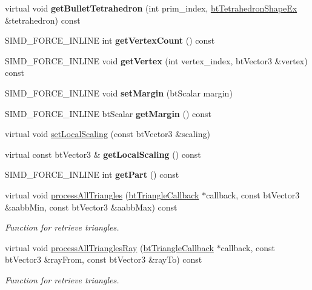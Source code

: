 \begin{DoxyCompactItemize}
virtual void {\bfseries get\+Bullet\+Tetrahedron} (int prim\+\_\+index, \hyperlink{classbtTetrahedronShapeEx}{bt\+Tetrahedron\+Shape\+Ex} \&tetrahedron) const
\item 
\mbox{\label{classbtGImpactMeshShapePart_a1f769ae0853fc7f336481b3b9be5cdef}} 
S\+I\+M\+D\+\_\+\+F\+O\+R\+C\+E\+\_\+\+I\+N\+L\+I\+NE int {\bfseries get\+Vertex\+Count} () const
\item 
\mbox{\label{classbtGImpactMeshShapePart_a40427b8e3fdfcc490b08f580a9199ee5}} 
S\+I\+M\+D\+\_\+\+F\+O\+R\+C\+E\+\_\+\+I\+N\+L\+I\+NE void {\bfseries get\+Vertex} (int vertex\+\_\+index, bt\+Vector3 \&vertex) const
\item 
\mbox{\label{classbtGImpactMeshShapePart_a6f77efd41c832e436bfd6cca7d3269e7}} 
S\+I\+M\+D\+\_\+\+F\+O\+R\+C\+E\+\_\+\+I\+N\+L\+I\+NE void {\bfseries set\+Margin} (bt\+Scalar margin)
\item 
\mbox{\label{classbtGImpactMeshShapePart_ad6ad76f22c8d08c71fda98b53ab2ce4d}} 
S\+I\+M\+D\+\_\+\+F\+O\+R\+C\+E\+\_\+\+I\+N\+L\+I\+NE bt\+Scalar {\bfseries get\+Margin} () const
\item 
virtual void \hyperlink{classbtGImpactMeshShapePart_a2c1de297d020a75e1ab0f10f7c71478f}{set\+Local\+Scaling} (const bt\+Vector3 \&scaling)
\item 
\mbox{\label{classbtGImpactMeshShapePart_af0428a406356b3c9b157efc4a5116a79}} 
virtual const bt\+Vector3 \& {\bfseries get\+Local\+Scaling} () const
\item 
\mbox{\label{classbtGImpactMeshShapePart_a0b9a1dbcc0acd7a3082b2dbfbc5ef5d5}} 
S\+I\+M\+D\+\_\+\+F\+O\+R\+C\+E\+\_\+\+I\+N\+L\+I\+NE int {\bfseries get\+Part} () const
\item 
virtual void \hyperlink{classbtGImpactMeshShapePart_a85befbcefc4db8ce35db58dc1965d512}{process\+All\+Triangles} (\hyperlink{classbtTriangleCallback}{bt\+Triangle\+Callback} $\ast$callback, const bt\+Vector3 \&aabb\+Min, const bt\+Vector3 \&aabb\+Max) const
\begin{DoxyCompactList}\small\item\em Function for retrieve triangles. \end{DoxyCompactList}\item 
virtual void \hyperlink{classbtGImpactMeshShapePart_a5a7308f0d61d403394d909b45506a7e9}{process\+All\+Triangles\+Ray} (\hyperlink{classbtTriangleCallback}{bt\+Triangle\+Callback} $\ast$callback, const bt\+Vector3 \&ray\+From, const bt\+Vector3 \&ray\+To) const
\begin{DoxyCompactList}\small\item\em Function for retrieve triangles. \end{DoxyCompactList}\end{DoxyCompactItemize}

